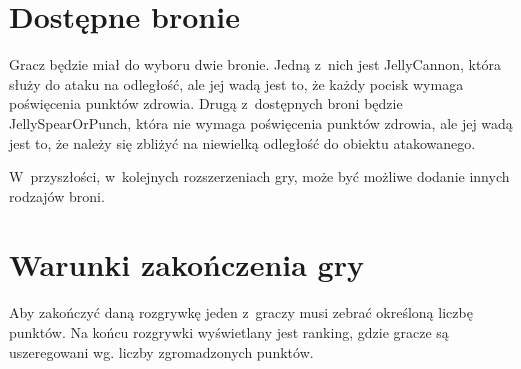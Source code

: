 \section{Dostępne bronie}
Gracz będzie miał do wyboru dwie bronie. Jedną z~nich jest JellyCannon, która służy do ataku na odległość, ale jej wadą jest to, że każdy pocisk wymaga poświęcenia punktów zdrowia. Drugą z~dostępnych broni będzie JellySpearOrPunch, która nie wymaga poświęcenia punktów zdrowia, ale jej wadą jest to, że należy się zbliżyć na niewielką odległość do obiektu atakowanego.

W~przyszłości, w~kolejnych rozszerzeniach gry, może być możliwe dodanie innych rodzajów broni.

\section{Warunki zakończenia gry}
Aby zakończyć daną rozgrywkę jeden z~graczy musi zebrać określoną liczbę punktów. Na końcu rozgrywki wyświetlany jest ranking, gdzie gracze są uszeregowani wg. liczby zgromadzonych punktów.

